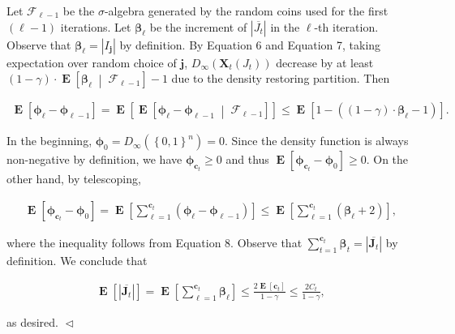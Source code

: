 \documentclass[10pt,a4paper]{article}
\begin{document}
Let $\mathcal{F}_{\ell-1}$ be the $\sigma$-algebra generated by the random coins used for the first $(\ell-1)$ iterations.
Let $\bm{\beta}_{\ell}$ be the increment of $|\overline{J_{t}}|$ in the $\ell$-th iteration.
Observe that $\bm{\beta}_{\ell}=|I_{\bm{j}}|$ by definition.
By Equation 6 and Equation 7,
taking expectation over random choice of $\bm{j}$,
$D_{\infty}(\bm{X}_{t}(J_{t}))$ decrease by at least $(1-\gamma)\cdot\operatorname*{\mathbf{E}}\left[\bm{\beta}_{\ell}\;\middle|\;\mathcal{F}_{\ell-1}\right]-1$ due to the density restoring partition.
Then\par


\[\begin{gathered}
\operatorname*{\mathbf{E}}\left[\bm{\phi}_{\ell}-\bm{\phi}_{\ell-1}\right]=\operatorname*{\mathbf{E}}\left[\operatorname*{\mathbf{E}}\left[\bm{\phi}_{\ell}-\bm{\phi}_{\ell-1}\;\middle|\;\mathcal{F}_{\ell-1}\right]\right]\leq\operatorname*{\mathbf{E}}\left[1-((1-\gamma)\cdot\bm{\beta}_{\ell}-1)\right].
\end{gathered}\]


In the beginning, $\bm{\phi}_{0}=D_{\infty}(\left\{0,1\right\}^{n})=0$.
Since the density function is always non-negative by definition, we have $\bm{\phi}_{\bm{c}_{t}}\geq 0$ and thus $\operatorname*{\mathbf{E}}\left[\bm{\phi}_{\bm{c}_{t}}-\bm{\phi}_{0}\right]\geq 0.$
On the other hand, by telescoping,\par


\[\begin{gathered}
\operatorname*{\mathbf{E}}\left[\bm{\phi}_{\bm{c}_{t}}-\bm{\phi}_{0}\right]=\operatorname*{\mathbf{E}}\left[\sum_{\ell=1}^{\bm{c}_{t}}(\bm{\phi}_{\ell}-\bm{\phi}_{\ell-1})\right]\leq\operatorname*{\mathbf{E}}\left[\sum_{\ell=1}^{\bm{c}_{t}}(\bm{\beta}_{\ell}+2)\right],
\end{gathered}\]


where the inequality follows from Equation 8.
Observe that
$\sum_{t=1}^{\bm{c}_{t}}\bm{\beta}_{t}=|\overline{\bm{J}_{t}}|$ by definition.
We conclude that\par


\[\begin{gathered}
\operatorname*{\mathbf{E}}\left[|\overline{\bm{J}_{t}}|\right]=\operatorname*{\mathbf{E}}\left[\sum_{\ell=1}^{\bm{c}_{t}}\bm{\beta}_{\ell}\right]\leq\frac{2\operatorname*{\mathbf{E}}\left[\bm{c}_{t}\right]}{1-\gamma}\leq\frac{2C_{t}}{1-\gamma},
\end{gathered}\]


as desired.
$\vartriangleleft$\par
\end{document}
